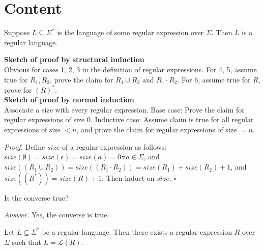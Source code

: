 \documentclass[a4paper]{article}
\newenvironment{proof}{\begin{breakbox}\textit{Proof.}}{\hfill$\square$\end{breakbox}}
\newenvironment{ans}{\begin{breakbox}\textit{Answer.}}{\end{breakbox}}
\newcommand{\mc}{\mathcal}
\renewcommand{\L}{\mc{L}}
\begin{document}
\section{Content}

\begin{theorem}
	Suppose $L \subseteq \Sigma^*$ is the language of some regular expression over $\Sigma$. Then $L$ is a regular language.
\end{theorem}

\begin{note}
	\textbf{Sketch of proof by structural induction}\\

	Obvious for cases 1, 2, 3 in the definition of regular expressions. For 4, 5, assume true for $R_1, R_2$, prove the claim for $R_1 \cup R_2$ and $R_1 \cdot R_2$. For 6, assume true for $R$, prove
	for $(R)^*$.\\

	\textbf{Sketch of proof by normal induction}\\

	Associate a size with every regular expression.
	Base case: Prove the claim for regular expressions of size 0.
	Inductive case: Assume claim is true for all regular expressions of size $< n$, and prove the claim for regular expressions of size $= n$.\\
\end{note}

\begin{proof}
	Define $\mathit{size}$ of a regular expression as follows:
	$\mathit{size}(\emptyset) = \mathit{size}(\epsilon) = \mathit{size}(a) = 0 \forall a \in \Sigma$, and $\mathit{size}((R_1 \cup R_2)) = \mathit{size}((R_1 \cdot R_2)) =
		\mathit{size}(R_1) + \mathit{size}(R_2) + 1$, and $\mathit{size}((R^*)) = \mathit{size}(R) + 1$.
	Then induct on $\mathit{size}$.
\end{proof}

\begin{ques}
	Is the converse true?
\end{ques}

\begin{ans}
	Yes, the converse is true.
\end{ans}

\begin{theorem}
	Let $L \subseteq \Sigma^*$ be a regular language. Then there exists a regular expression $R$ over $\Sigma$ such that $L = \L(R)$.
\end{theorem}
\end{document}
